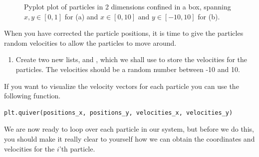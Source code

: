 \documentclass{article}
\begin{document}
\begin{figure}[htb]
  \centering
  \caption{
    Pyplot plot of particles in 2 dimensions confined in a box, spanning $x, y \in [0,1]$ for (a) and $x \in [0,10]$ and $y \in [-10,10]$ for (b).
  }
\end{figure}

\newpage

When you have corrected the particle positions, it is time to give the particles random velocities to allow the particles to move around.

\begin{enumerate}[resume]
    \item Create two new lists,  and , which we shall use to store the velocities for the particles.
    The velocities should be a random number between -10 and 10.
\end{enumerate}

If you want to visualize the velocity vectors for each particle you can use the following function.\\

\begin{lstlisting}
plt.quiver(positions_x, positions_y, velocities_x, velocities_y)
\end{lstlisting}

We are now ready to loop over each particle in our system, but before we do this, you should make it really clear to yourself how we can obtain the coordinates and velocities for the $i$'th particle.
\end{document}

